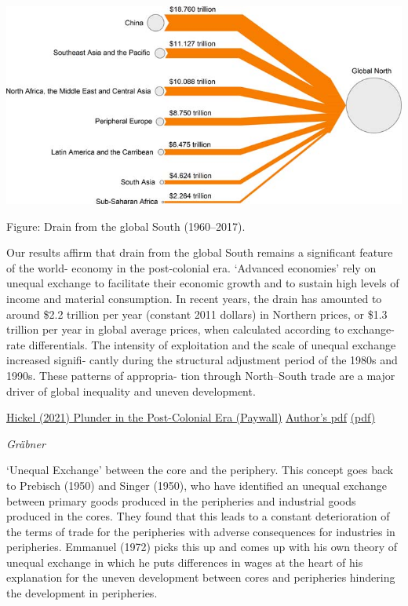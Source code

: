 \documentclass[
]{book}
\begin{document}
\includegraphics{fig/Hickel_Drain_from_Global_South.png}

Figure: Drain from the global South (1960--2017).

Our results affirm that drain from the global South remains a significant feature of the world-
economy in the post-colonial era. `Advanced economies' rely on unequal exchange to facilitate
their economic growth and to sustain high levels of income and material consumption. In recent
years, the drain has amounted to around \$2.2 trillion per year (constant 2011 dollars) in Northern
prices, or \$1.3 trillion per year in global average prices, when calculated according to exchange-
rate differentials. The intensity of exploitation and the scale of unequal exchange increased signifi-
cantly during the structural adjustment period of the 1980s and 1990s. These patterns of appropria-
tion through North--South trade are a major driver of global inequality and uneven development.

\href{https://doi.org/10.1080/13563467.2021.1899153}{Hickel (2021) Plunder in the Post-Colonial Era (Paywall)}
\href{https://t.co/1WGPwjTWuB?amp=1}{Author's pdf}
\href{pdf/Hickel_2021_Plunder.pdf}{(pdf)}

\emph{Gräbner}

`Unequal Exchange' between the core and the
periphery. This concept goes back to Prebisch (1950) and
Singer (1950), who have identified an unequal exchange
between primary goods produced in the peripheries and
industrial goods produced in the cores. They found that this
leads to a constant deterioration of the terms of trade for
the peripheries with adverse consequences for industries
in peripheries. Emmanuel (1972) picks this up and comes
up with his own theory of unequal exchange in which he
puts differences in wages at the heart of his explanation
for the uneven development between cores and peripheries
hindering the development in peripheries.
\end{document}
